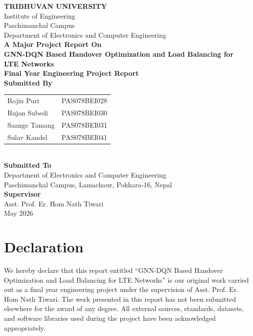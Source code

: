 \documentclass[12pt,a4paper]{report}
\newcommand{\projecttitle}{GNN-DQN Based Handover Optimization and Load Balancing for LTE Networks}
\begin{document}

\begin{titlepage}
\centering
\vspace*{0.5cm}
{\Large \textbf{TRIBHUVAN UNIVERSITY}}\\
{\large Institute of Engineering}\\
{\large Paschimanchal Campus}\\
{\large Department of Electronics and Computer Engineering}\\[1.2cm]

{\Large \textbf{A Major Project Report On}}\\[0.4cm]
{\huge \textbf{\projecttitle}}\\[0.6cm]
{\large \textbf{Final Year Engineering Project Report}}\\[1.2cm]

\textbf{Submitted By}\\[0.2cm]
\begin{tabular}{ll}
Rojin Puri & PAS078BEI028\\
Rujan Subedi & PAS078BEI030\\
Saange Tamang & PAS078BEI031\\
Sulav Kandel & PAS078BEI041\\
\end{tabular}\\[1.0cm]

\textbf{Submitted To}\\[0.2cm]
Department of Electronics and Computer Engineering\\
Paschimanchal Campus, Lamachaur, Pokhara-16, Nepal\\[0.8cm]

\textbf{Supervisor}\\[0.2cm]
Asst. Prof. Er. Hom Nath Tiwari\\[1.0cm]

\vfill
{\large May 2026}
\end{titlepage}

\chapter*{Declaration}
We hereby declare that this report entitled ``\projecttitle'' is our original work carried out as a final year engineering project under the supervision of Asst. Prof. Er. Hom Nath Tiwari. The work presented in this report has not been submitted elsewhere for the award of any degree. All external sources, standards, datasets, and software libraries used during the project have been acknowledged appropriately.
\end{document}
